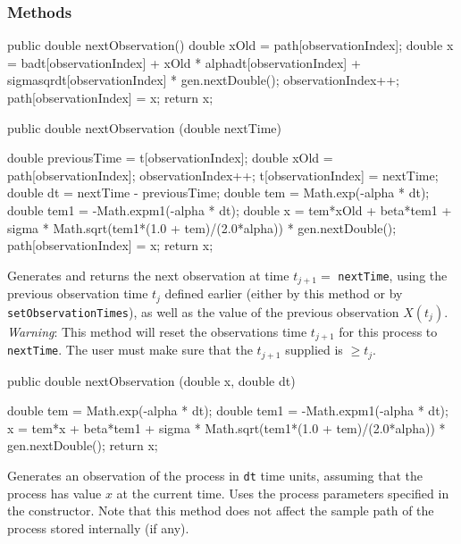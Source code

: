 \subsubsection* {Methods}
\begin{code}\begin{hide}

   public double nextObservation() {
        double xOld = path[observationIndex];
        double x = badt[observationIndex] + xOld * alphadt[observationIndex]
                   + sigmasqrdt[observationIndex] * gen.nextDouble();
        observationIndex++;
        path[observationIndex] = x;
        return x;
    }\end{hide}

   public double nextObservation (double nextTime) \begin{hide} {
        double previousTime = t[observationIndex];
        double xOld = path[observationIndex];
        observationIndex++;
        t[observationIndex] = nextTime;
        double dt = nextTime - previousTime;
        double tem = Math.exp(-alpha * dt);
        double tem1 = -Math.expm1(-alpha * dt);
        double x = tem*xOld + beta*tem1 + sigma *
            Math.sqrt(tem1*(1.0 + tem)/(2.0*alpha)) * gen.nextDouble();
        path[observationIndex] = x;
        return x;
    }\end{hide}
\end{code}
\begin{tabb} Generates and returns the next observation at time $t_{j+1} =$
 \texttt{nextTime}, using the previous observation time $t_{j}$ defined earlier 
(either by this method or by \texttt{setObservationTimes}), 
as well as the value of the previous observation $X(t_j)$. 
\emph{Warning}: This method will reset the observations time $t_{j+1}$
for this process to \texttt{nextTime}. The user must make sure that
the $t_{j+1}$ supplied is $\geq t_{j}$.
\end{tabb}
\begin{code}

   public double nextObservation (double x, double dt) \begin{hide} {
        double tem = Math.exp(-alpha * dt);
        double tem1 = -Math.expm1(-alpha * dt);
        x = tem*x + beta*tem1 + sigma *
            Math.sqrt(tem1*(1.0 + tem)/(2.0*alpha)) * gen.nextDouble();
        return x;
    }\end{hide}
\end{code}
\begin{tabb} Generates an observation of the process in \texttt{dt} time units,
assuming that the process has value $x$ at the current time.
Uses the process parameters specified in the constructor.
Note that this method does not affect the sample path of the process 
stored internally (if any).
\end{tabb}
